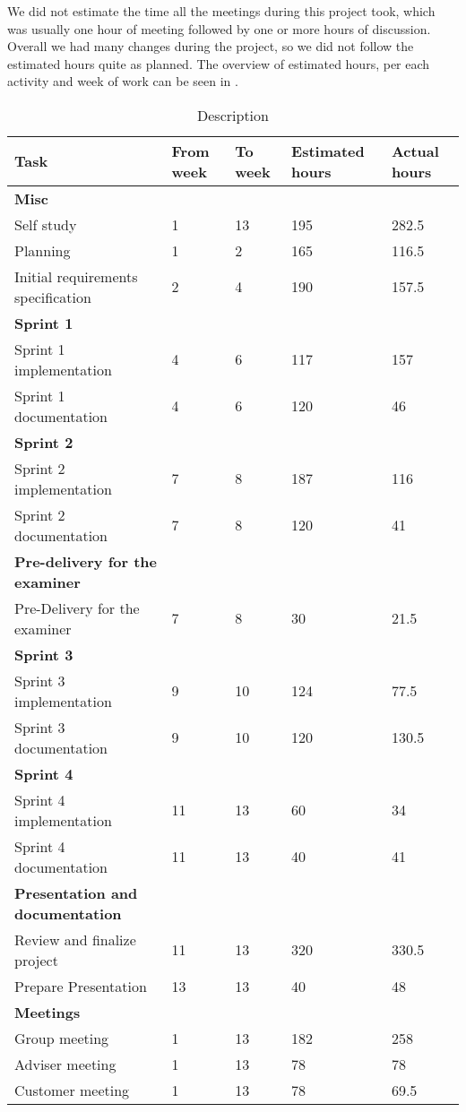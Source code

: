 \documentclass[../document]{subfiles}
\begin{document}
We did not estimate the time all the meetings during this project took, which was usually one hour of meeting followed by one or more hours of discussion. Overall we had many changes during the project, so we did not follow the estimated hours quite as planned. The overview of estimated hours, per each activity and week of work can be seen in .


\begin{table}
\caption{Description}
\centering
\label{tab:time_estimate}
\begin{tabularx}{\textwidth}{|l|X|X|L{1.6cm}|X|}
	\hline
	\textbf{Task}
	&\textbf{From week}
	&\textbf{To week}
	&\textbf{Estimated hours}
	&\textbf{Actual hours}
	\\ \hline \textbf{Misc}
	&
	&
	&
	&
	\\ \hline Self study
	&1
	&13
	&195
	&282.5
	\\ \hline Planning
	&1
	&2
	&165
	&116.5
	\\ \hline Initial requirements specification
	&2
	&4
	&190
	&157.5
	\\ \hline \textbf{Sprint 1}
	&
	&
	&
	&
	\\ \hline Sprint 1 implementation
	&4
	&6
	&117
	&157
	\\ \hline Sprint 1 documentation
	&4
	&6
	&120
	&46
	\\ \hline \textbf{Sprint 2}
	&
	&
	&
	&
	\\ \hline Sprint 2 implementation
	&7
	&8
	&187
	&116
	\\ \hline Sprint 2 documentation
	&7
	&8
	&120
	&41
	\\ \hline \textbf{Pre-delivery for the examiner}
	&
	&
	&
	&
	\\ \hline Pre-Delivery for the examiner
	&7
	&8
	&30
	&21.5
	\\ \hline \textbf{Sprint 3}
	&
	&
	&
	&
	\\ \hline Sprint 3 implementation
	&9
	&10
	&124
	&77.5
	\\ \hline Sprint 3 documentation
	&9
	&10
	&120
	&130.5
	\\ \hline \textbf{Sprint 4}
	&
	&
	&
	&
	\\ \hline Sprint 4 implementation
	&11
	&13
	&60
	&34
	\\ \hline Sprint 4 documentation
	&11
	&13
	&40
	&41
	\\ \hline \textbf{Presentation and documentation}
	&
	&
	&
	&
	\\ \hline Review and finalize project
	&11
	&13
	&320
	&330.5
	\\ \hline Prepare Presentation
	&13
	&13
	&40
	&48
	\\ \hline \textbf{Meetings}
	&
	&
	&
	&
	\\ \hline Group meeting
	&1
	&13
	&182
	&258
	\\ \hline Adviser meeting
	&1
	&13
	&78
	&78
	\\ \hline Customer meeting
	&1
	&13
	&78
	&69.5
	\\ \hline 
\end{tabularx}
\end{table}
\end{document}
